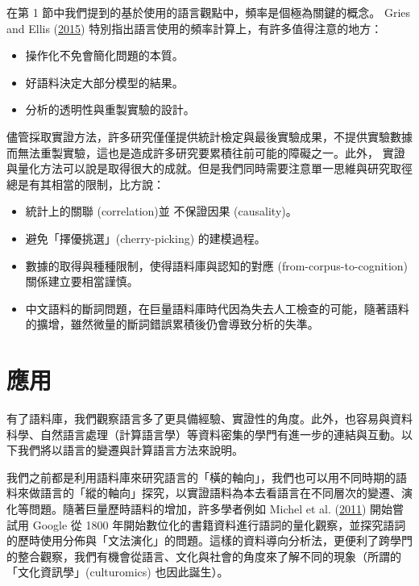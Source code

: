 在第 1 節中我們提到的基於使用的語言觀點中，頻率是個極為關鍵的概念。 Gries and Ellis (\hyperlink{bookmarkid2u6wntf}{2015}) 特別指出語言使用的頻率計算上，有許多值得注意的地方：

\begin{itemize}
\item 操作化不免會簡化問題的本質。

\item 好語料決定大部分模型的結果。

\item 分析的透明性與重製實驗的設計。

\end{itemize}

儘管採取實證方法，許多研究僅僅提供統計檢定與最後實驗成果，不提供實驗數據 而無法重製實驗，這也是造成許多研究要累積往前可能的障礙之一。此外， 實證與量化方法可以說是取得很大的成就。但是我們同時需要注意單一思維與研究取徑總是有其相當的限制，比方說：

\begin{itemize}
\item 統計上的關聯 (correlation)並 不保證因果 (causality)。

\item 避免「擇優挑選」(cherry-picking) 的建模過程。

\item 數據的取得與種種限制，使得語料庫與認知的對應 (from-corpus-to-cognition) 關係建立要相當謹慎。

\item 中文語料的斷詞問題，在巨量語料庫時代因為失去人工檢查的可能，隨著語料的擴增，雖然微量的斷詞錯誤累積後仍會導致分析的失準。

\end{itemize}
\section{應用}

有了語料庫，我們觀察語言多了更具備經驗、實證性的角度。此外，也容易與資料科學、自然語言處理（計算語言學）等資料密集的學門有進一步的連結與互動。以下我們將以語言的變遷與計算語言方法來說明。

我們之前都是利用語料庫來研究語言的「橫的軸向」，我們也可以用不同時期的語料來做語言的「縱的軸向」探究，以實證語料為本去看語言在不同層次的變遷、演化等問題。隨著巨量歷時語料的增加，許多學者例如 Michel et al. (\hyperlink{bookmarkid37m2jsg}{2011}) 開始嘗試用 Google 從 1800 年開始數位化的書籍資料進行語詞的量化觀察，並探究語詞的歷時使用分佈與「文法演化」的問題。這樣的資料導向分析法，更便利了跨學門的整合觀察，我們有機會從語言、文化與社會的角度來了解不同的現象（所謂的「文化資訊學」(culturomics) 也因此誕生）。

